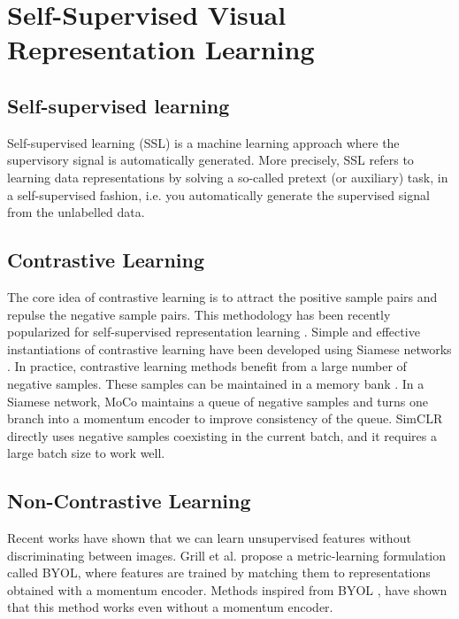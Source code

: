 \documentclass[letterpaper, 12pt]{book}
\theoremstyle{definition}
\theoremstyle{definition}
\theoremstyle{definition}
\theoremstyle{definition}
\theoremstyle{definition}
\begin{document}
\section{Self-Supervised Visual Representation Learning \label{org1c26f0f}}
\label{sec:org1e13343}

\subsection{Self-supervised learning}
\label{sec:org345d0b5}
Self-supervised learning (SSL) is a machine learning approach where the
supervisory signal is automatically generated. More precisely, SSL refers to
learning data representations by solving a so-called pretext (or auxiliary)
task, in a self-supervised fashion, i.e. you automatically generate the
supervised signal from the unlabelled data.

\subsection{Contrastive Learning}
\label{sec:orgbef5b82}
The core idea of contrastive learning is to attract the positive sample pairs
and repulse the negative sample pairs. This methodology has been recently
popularized for self-supervised representation learning \cite{Wu2018}. Simple
and effective instantiations of contrastive learning have been developed using
Siamese networks \cite{He2019,Chen2020a,Zbontar2021}. In practice,
contrastive learning methods benefit from a large number of negative
samples. These samples can be maintained in a memory bank \cite{Wu2018}. In a
Siamese network, MoCo \cite{He2019} maintains a queue of negative samples and
turns one branch into a momentum encoder to improve consistency of the
queue. SimCLR \cite{Chen2020a} directly uses negative samples coexisting in the
current batch, and it requires a large batch size to work well.

\subsection{Non-Contrastive Learning}
\label{sec:org87de3bb}
Recent works have shown that we can learn unsupervised features without
discriminating between images. Grill et al. \cite{Grill2020} propose a
metric-learning formulation called BYOL, where features are trained by matching
them to representations obtained with a momentum encoder. Methods inspired from
BYOL \cite{Chen2020,Caron2021}, have shown that this method works even without a
momentum encoder.
\end{document}
